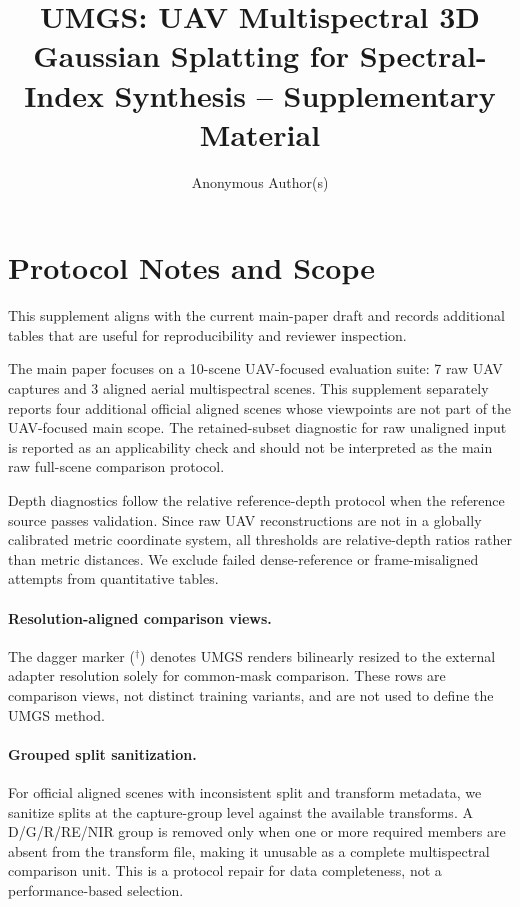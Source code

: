 ﻿\documentclass[acmtog,anonymous,review]{acmart}
\begin{document}
\title{UMGS: UAV Multispectral 3D Gaussian Splatting for Spectral-Index Synthesis -- Supplementary Material}

\author{Anonymous Author(s)}


\maketitle

\section{Protocol Notes and Scope}

This supplement aligns with the current main-paper draft and records additional tables that are useful for reproducibility and reviewer inspection.

The main paper focuses on a 10-scene UAV-focused evaluation suite: 7 raw UAV captures and 3 aligned aerial multispectral scenes. This supplement separately reports four additional official aligned scenes whose viewpoints are not part of the UAV-focused main scope. The retained-subset diagnostic for raw unaligned input is reported as an applicability check and should not be interpreted as the main raw full-scene comparison protocol.

Depth diagnostics follow the relative reference-depth protocol when the reference source passes validation. Since raw UAV reconstructions are not in a globally calibrated metric coordinate system, all thresholds are relative-depth ratios rather than metric distances. We exclude failed dense-reference or frame-misaligned attempts from quantitative tables.

\paragraph{Resolution-aligned comparison views.}
The dagger marker ($^\dagger$) denotes UMGS renders bilinearly resized to the external adapter resolution solely for common-mask comparison. These rows are comparison views, not distinct training variants, and are not used to define the UMGS method.

\paragraph{Grouped split sanitization.}
For official aligned scenes with inconsistent split and transform metadata, we sanitize splits at the capture-group level against the available transforms. A D/G/R/RE/NIR group is removed only when one or more required members are absent from the transform file, making it unusable as a complete multispectral comparison unit. This is a protocol repair for data completeness, not a performance-based selection.
\end{document}

